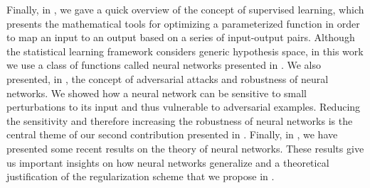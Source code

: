 Finally, in , we gave a quick overview of the concept of supervised learning, which presents the mathematical tools for optimizing a parameterized function in order to map an input to an output based on a series of input-output pairs. 
Although the statistical learning framework considers generic hypothesis space, in this work we use a class of functions called neural networks presented in .
We also presented, in , the concept of adversarial attacks and robustness of neural networks.
We showed how a neural network can be sensitive to small perturbations to its input and thus vulnerable to adversarial examples.
Reducing the sensitivity and therefore increasing the robustness of neural networks is the central theme of our second contribution presented in .
Finally, in , we have presented some recent results on the theory of neural networks.
These results give us important insights on how neural networks generalize and a theoretical justification of the regularization scheme that we propose in .





